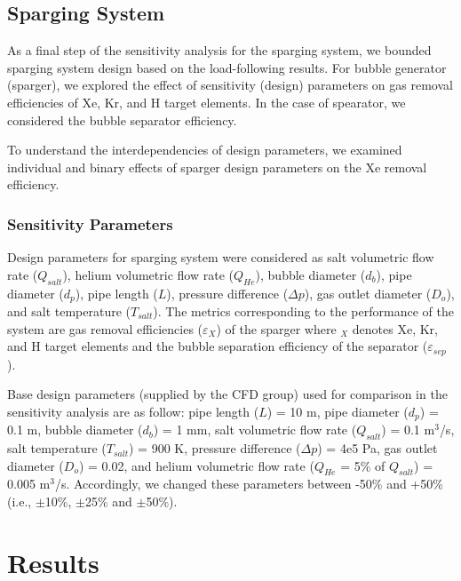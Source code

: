 \subsection{Sparging System}

    As a final step of the sensitivity analysis for the sparging system, we 
    bounded sparging system design based on the load-following results. For 
    bubble generator (sparger), we explored the effect of sensitivity (design) 
    parameters on gas removal efficiencies of Xe, Kr, and H target elements. In 
    the case of spearator, we considered the bubble separator efficiency.

    To understand the interdependencies of design parameters, we examined 
    individual and binary effects of sparger design parameters on the Xe 
    removal efficiency.

\subsubsection{Sensitivity Parameters}

    Design parameters for sparging system were considered as salt volumetric 
    flow rate ($Q_{salt}$), helium volumetric flow rate ($Q_{He}$), bubble 
    diameter ($d_b$), pipe diameter ($d_p$), pipe length ($L$), pressure 
    difference ($\Delta p$), gas outlet diameter ($D_o$), and salt temperature 
    ($T_{salt}$). The metrics corresponding to the performance of the system 
    are gas removal efficiencies ($\varepsilon$$_{X}$) of the sparger where 
    $_{X}$ denotes Xe, Kr, and H target elements and the bubble separation 
    efficiency of the separator ($\varepsilon$$_{sep}$).

    Base design parameters (supplied by the CFD group) used for comparison in 
    the sensitivity analysis are as follow: pipe length ($L$) = 10 m, pipe 
    diameter ($d_p$) = 0.1 m, bubble diameter ($d_b$) = 1 mm, salt volumetric 
    flow rate ($Q_{salt}$) = 0.1 m$^{3}$/s, salt temperature ($T_{salt}$) = 900 
    K, pressure difference ($\Delta p$) = 4e5 Pa, gas outlet diameter ($D_o$) = 
    0.02, and helium volumetric flow rate ($Q_{He}$ = 5\% of $Q_{salt}$) = 
    0.005 m$^{3}$/s. Accordingly, we changed these parameters between -50\% and 
    +50\% (i.e., $\pm$10\%, $\pm$25\% and $\pm$50\%).

\FloatBarrier

\section{Results}

